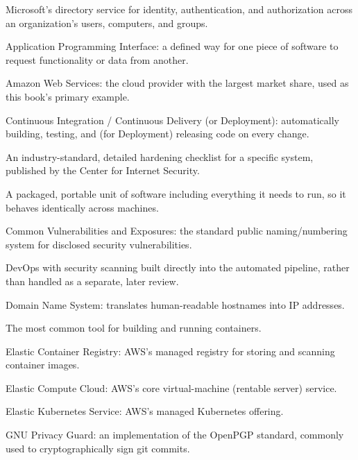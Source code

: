 \documentclass[11pt,twoside,openright]{book}
\begin{document}
\begin{description}[leftmargin=2.2em,style=nextline]
\item[\hypertarget{gls:AD}{AD (Active Directory)}] Microsoft's directory service for identity, authentication,
  and authorization across an organization's users, computers, and groups.
\item[\hypertarget{gls:API}{API}] Application Programming Interface: a defined way for one piece of software to
  request functionality or data from another.
\item[\hypertarget{gls:AWS}{AWS}] Amazon Web Services: the cloud provider with the largest market share, used
  as this book's primary example.
\item[\hypertarget{gls:CICD}{CI/CD}] Continuous Integration / Continuous Delivery (or Deployment): automatically
  building, testing, and (for Deployment) releasing code on every change.
\item[\hypertarget{gls:CIS}{CIS Benchmark}] An industry-standard, detailed hardening checklist for a specific
  system, published by the Center for Internet Security.
\item[Container] A packaged, portable unit of software including everything it needs to
  run, so it behaves identically across machines.
\item[\hypertarget{gls:CVE}{CVE}] Common Vulnerabilities and Exposures: the standard public naming/numbering
  system for disclosed security vulnerabilities.
\item[DevSecOps] DevOps with security scanning built directly into the automated pipeline,
  rather than handled as a separate, later review.
\item[\hypertarget{gls:DNS}{DNS}] Domain Name System: translates human-readable hostnames into IP addresses.
\item[Docker] The most common tool for building and running containers.
\item[\hypertarget{gls:ECR}{ECR}] Elastic Container Registry: AWS's managed registry for storing and scanning
  container images.
\item[\hypertarget{gls:ECTwo}{EC2}] Elastic Compute Cloud: AWS's core virtual-machine (rentable server) service.
\item[\hypertarget{gls:EKS}{EKS}] Elastic Kubernetes Service: AWS's managed Kubernetes offering.
\item[\hypertarget{gls:GPG}{GPG}] GNU Privacy Guard: an implementation of the OpenPGP standard, commonly used
  to cryptographically sign git commits.

\end{description}
\end{document}
